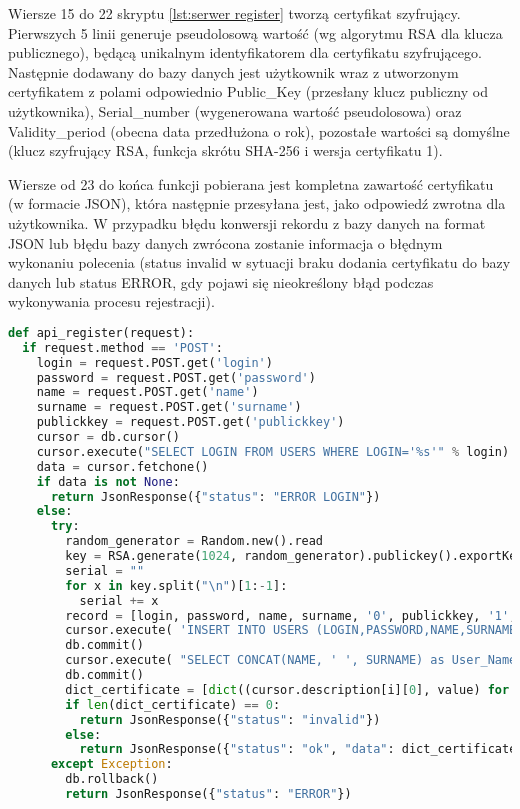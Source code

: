 Wiersze 15 do 22 skryptu \ref{lst:serwer register} tworzą certyfikat szyfrujący. Pierwszych 5 linii generuje pseudolosową wartość (wg algorytmu RSA dla klucza publicznego), będącą unikalnym identyfikatorem dla certyfikatu szyfrującego. Następnie dodawany do bazy danych jest użytkownik wraz z utworzonym certyfikatem z polami odpowiednio Public\_Key (przesłany klucz publiczny od użytkownika), Serial\_number (wygenerowana wartość pseudolosowa) oraz Validity\_period (obecna data przedłużona o rok), pozostałe wartości są domyślne (klucz szyfrujący RSA, funkcja skrótu SHA-256 i wersja certyfikatu 1).

Wiersze od 23 do końca funkcji pobierana jest kompletna zawartość certyfikatu (w formacie JSON), która następnie przesyłana jest, jako odpowiedź zwrotna dla użytkownika. W przypadku błędu konwersji rekordu z bazy danych na format JSON lub błędu bazy danych zwrócona zostanie informacja o błędnym wykonaniu polecenia (status invalid w sytuacji braku dodania certyfikatu do bazy danych lub status ERROR, gdy pojawi się nieokreślony błąd podczas wykonywania procesu rejestracji).

{\footnotesize
\begin{lstlisting}[caption={API rejestracji}, label={lst:serwer register}, language=Python]	
def api_register(request):
  if request.method == 'POST':
    login = request.POST.get('login')
    password = request.POST.get('password')
    name = request.POST.get('name')
    surname = request.POST.get('surname')
    publickkey = request.POST.get('publickkey')
    cursor = db.cursor()
    cursor.execute("SELECT LOGIN FROM USERS WHERE LOGIN='%s'" % login)
    data = cursor.fetchone()
    if data is not None:
      return JsonResponse({"status": "ERROR LOGIN"})
    else:
      try:
        random_generator = Random.new().read
        key = RSA.generate(1024, random_generator).publickey().exportKey()
        serial = ""
        for x in key.split("\n")[1:-1]:
          serial += x
        record = [login, password, name, surname, '0', publickkey, '1', serial, datetime.now().replace(year=datetime.now().year + 1)]
        cursor.execute( 'INSERT INTO USERS (LOGIN,PASSWORD,NAME,SURNAME,IS_ADMIN,PUBLIC_KEY, ISACTIVATED, Serial_number, Validitiy_period) VALUES(%s,%s,%s,%s,%s,%s,%s,%s,%s)', record)
        db.commit()
        cursor.execute( "SELECT CONCAT(NAME, ' ', SURNAME) as User_Name, LOGIN as Issuer_name,  PUBLIC_KEY, Serial_number, Validitiy_period, Version, Signature_Algorithm_Identifier, Hash_Algorithm FROM `users` WHERE `LOGIN` = '%s'" % (login))
        db.commit()
        dict_certificate = [dict((cursor.description[i][0], value) for i, value in enumerate(row)) for row in cursor.fetchall()]
        if len(dict_certificate) == 0:
          return JsonResponse({"status": "invalid"})
        else:
          return JsonResponse({"status": "ok", "data": dict_certificate})
      except Exception:
        db.rollback()
        return JsonResponse({"status": "ERROR"})
\end{lstlisting}}
\newpage
